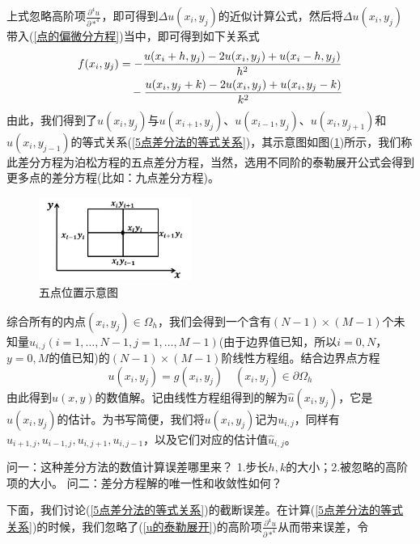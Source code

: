             上式忽略高阶项$\frac{\partial^4 u}{\partial *^4}$，即可得到$\Delta u(x_i,y_j)$的近似计算公式，然后将$\Delta u(x_i,y_j)$带入(\ref{点的偏微分方程})当中，即可得到如下关系式
            \begin{align}
            \label{5点差分法的等式关系}
                f(x_i,y_j) &= - \frac{u(x_i+h,y_j) - 2u(x_i,y_j)+u(x_i-h, y_j)}{h^2} \notag\\
                &\quad - \frac{u(x_i,y_j + k) - 2u(x_i,y_j)+u(x_i, y_j - k)}{k^2}
            \end{align}
            由此，我们得到了$u(x_i,y_j)$与$u(x_{i+1},y_j)$、$u(x_{i-1},y_j)$、$u(x_i,y_{j+1})$和$u(x_i,y_{j-1})$的等式关系(\ref{5点差分法的等式关系})，其示意图如图(\ref{fig:五点位置示意图})所示，我们称此差分方程为泊松方程的五点差分方程，当然，选用不同阶的泰勒展开公式会得到更多点的差分方程(比如：九点差分方程)。
		\begin{figure}[H]
		\centering
		\includegraphics[width=5cm]{images/fivepoint_position.jpg}
		\caption{五点位置示意图}
		\label{fig:五点位置示意图}
		\end{figure}
            \par
            综合所有的内点$(x_i,y_j) \in \Omega_h$，我们会得到一个含有$(N-1)\times (M-1)$个未知量$u_{i,j}(i = 1,\dots,N-1,j = 1,\dots,M-1)$(由于边界值已知，所以$i = 0,N$，$y = 0,M$的值已知)的$(N-1)\times (M-1)$阶线性方程组。结合边界点方程
            \[
                u(x_i,y_j) = g(x_i,y_j) \quad (x_i,y_j) \in \partial \Omega_h
            \]
            由此得到$u(x,y)$的数值解。记由线性方程组得到的解为$\hat{u}(x_i,y_j)$，它是$u(x_i,y_j)$的估计。为书写简便，我们将$u(x_i,y_j)$记为$u_{i,j}$，同样有$u_{i+1,j},u_{i-1,j},u_{i,j+1},u_{i,j-1}$，以及它们对应的估计值$\hat{u}_{i,j}$。
            \par
            问一：这种差分方法的数值计算误差哪里来？
            1.步长$h,k$的大小；2.被忽略的高阶项的大小。
            问二：差分方程解的唯一性和收敛性如何？
            \par
            下面，我们讨论(\ref{5点差分法的等式关系})的截断误差。在计算(\ref{5点差分法的等式关系})的时候，我们忽略了(\ref{u的泰勒展开})的高阶项$\frac{\partial^4 u}{\partial *^4}$从而带来误差，令
